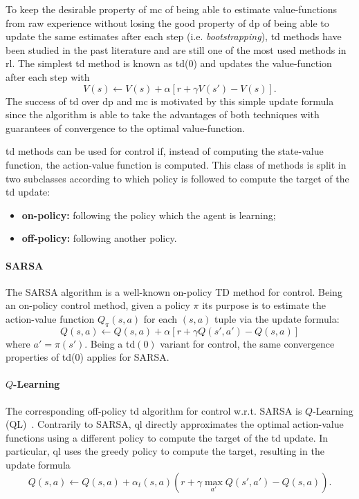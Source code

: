 To keep the desirable property of \gls{mc} of being able to estimate value-functions from raw experience without losing the good property of \gls{dp} of being able to update the same estimates after each step (i.e. \textit{bootstrapping}), \gls{td} methods have been studied in the past literature and are still one of the most used methods in \gls{rl}. The simplest \gls{td} method is known as \gls{td}(0) and updates the value-function after each step with
\begin{equation}
 V(s) \leftarrow V(s) + \alpha [r + \gamma V(s') - V(s)].
\end{equation}
The success of \gls{td} over \gls{dp} and \gls{mc} is motivated by this simple update formula since the algorithm is able to take the advantages of both techniques with guarantees of convergence to the optimal value-function.

\gls{td} methods can be used for control if, instead of computing the state-value function, the action-value function is computed. This class of methods is split in two subclasses according to which policy is followed to compute the target of the \gls{td} update:
\begin{itemize}
 \item \textbf{on-policy:} following the policy which the agent is learning;
 \item \textbf{off-policy:} following another policy.
\end{itemize}

\paragraph{SARSA}\label{S:SARSA}
The SARSA algorithm is a well-known on-policy TD method for control. Being an on-policy control method, given a policy $\pi$ its purpose is to estimate the action-value function $Q_\pi(s,a)$ for each $(s,a)$ tuple via the update formula:
\begin{equation}
 Q(s,a) \leftarrow Q(s,a) + \alpha [r + \gamma Q(s',a') - Q(s,a)]
\end{equation}
where $a' = \pi(s')$. Being a \gls{td}$(0)$ variant for control, the same convergence properties of \gls{td}(0) applies for SARSA.
\paragraph{$Q$-Learning}\label{S:Q-Learning}
The corresponding off-policy \gls{td} algorithm for control w.r.t. SARSA is $Q$-Learning (QL)~\cite{watkins1989learning}. Contrarily to SARSA, \gls{ql} directly approximates the optimal action-value functions using a different policy to compute the target of the \gls{td} update. In particular, \gls{ql} uses the greedy policy to compute the target, resulting in the update formula
\begin{equation}\label{eq:Q-formula}
 Q(s,a) \leftarrow Q(s,a) + \alpha_t(s,a) \left(r + \gamma \max_{a'} Q(s',a') - Q(s,a)\right).
\end{equation}

